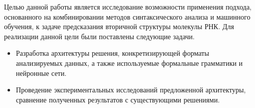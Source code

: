 Целью данной работы является исследование возможности применения подхода, основанного на комбинировании методов синтаксического анализа и машинного обучения, к задаче предсказания вторичной структуры молекулы РНК. Для реализации данной цели были поставлены следующие задачи.
\begin{itemize}
    \item Разработка архитектуры решения, конкретизирующей форматы анализируемых данных, а также используемые формальные грамматики и нейронные сети.
    \item Проведение экспериментальных исследований предложенной архитектуры, сравнение полученных результатов с существующими решениями.
\end{itemize}